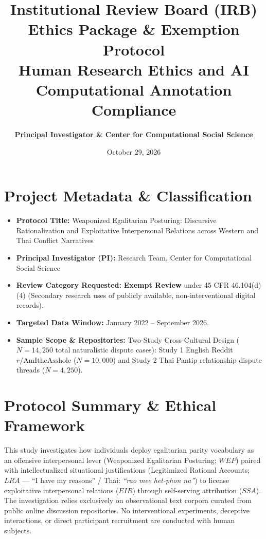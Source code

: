 \documentclass[11pt,a4paper]{article}
\title{\textbf{\Large Institutional Review Board (IRB) Ethics Package \& Exemption Protocol}\\[1ex]
\large Human Research Ethics and AI Computational Annotation Compliance}
\author{\textbf{Principal Investigator \& Center for Computational Social Science}}
\date{October 29, 2026}
\begin{document}
\maketitle

\section{Project Metadata \& Classification}
\begin{itemize}
    \item \textbf{Protocol Title:} Weaponized Egalitarian Posturing: Discursive Rationalization and Exploitative Interpersonal Relations across Western and Thai Conflict Narratives
    \item \textbf{Principal Investigator (PI):} Research Team, Center for Computational Social Science
    \item \textbf{Review Category Requested:} \textbf{Exempt Review} under 45 CFR 46.104(d)(4) (Secondary research uses of publicly available, non-interventional digital records).
    \item \textbf{Targeted Data Window:} January 2022 -- September 2026.
    \item \textbf{Sample Scope \& Repositories:} Two-Study Cross-Cultural Design ($N = 14,250$ total naturalistic dispute cases): Study 1 English Reddit $r/\text{AmItheAsshole}$ ($N = 10,000$) and Study 2 Thai Pantip relationship dispute threads ($N = 4,250$).
\end{itemize}

\section{Protocol Summary \& Ethical Framework}
This study investigates how individuals deploy egalitarian parity vocabulary as an offensive interpersonal lever (Weaponized Egalitarian Posturing; $WEP$) paired with intellectualized situational justifications (Legitimized Rational Accounts; $LRA$ --- ``I have my reasons'' / Thai: \textit{``rao mee het-phon na''}) to license exploitative interpersonal relations ($EIR$) through self-serving attribution ($SSA$). The investigation relies exclusively on observational text corpora curated from public online discussion repositories. No interventional experiments, deceptive interactions, or direct participant recruitment are conducted with human subjects.
\end{document}
